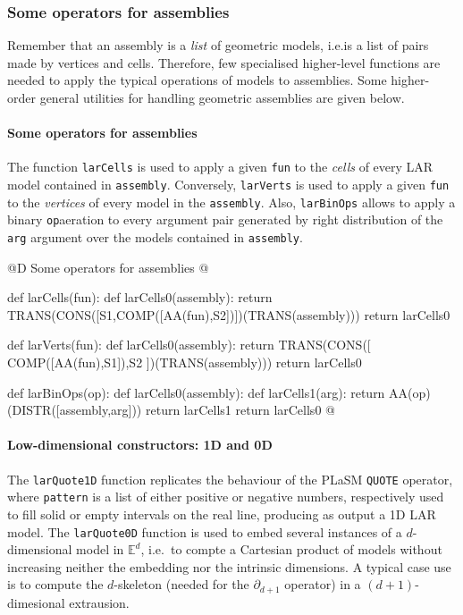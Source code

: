 \documentclass[11pt,oneside]{article}    %
\def\E{\mathbb{E}}
\begin{document}
\subsubsection{Some operators for assemblies}
Remember that an assembly is a \emph{list} of geometric models, i.e.is a list of pairs made by vertices and cells. Therefore, few specialised higher-level functions are needed to apply the typical operations of models to assemblies. Some higher-order general utilities for handling geometric assemblies are given below.  



\paragraph{Some operators for assemblies}
The function \texttt{larCells} is used to apply a given \texttt{fun} to the \emph{cells} of every LAR model contained in \texttt{assembly}. Conversely, \texttt{larVerts} is used to apply a given \texttt{fun} to the \emph{vertices} of every model in the \texttt{assembly}. Also, \texttt{larBinOps} allows to apply a binary \texttt{op}aeration to every argument pair generated by right distribution of the \texttt{arg} argument over the models contained in \texttt{assembly}.

@D Some operators for assemblies
@{
def larCells(fun):
    def larCells0(assembly):
        return TRANS(CONS([S1,COMP([AA(fun),S2])])(TRANS(assembly)))
    return larCells0

def larVerts(fun):
    def larCells0(assembly):
        return TRANS(CONS([ COMP([AA(fun),S1]),S2 ])(TRANS(assembly)))
    return larCells0

def larBinOps(op):
    def larCells0(assembly):
        def larCells1(arg):
            return AA(op)(DISTR([assembly,arg]))
        return larCells1
    return larCells0
@}

\paragraph{Low-dimensional constructors: 1D and 0D}
The \texttt{larQuote1D} function replicates the behaviour of the PLaSM \texttt{QUOTE} operator, where \texttt{pattern} is a list of either positive or negative numbers, respectively used to fill solid or empty intervals on the real line, producing as output a 1D LAR model. The \texttt{larQuote0D} function is used to embed several instances of a $d$-dimensional model in $\E^d$, i.e.~to compte a Cartesian product of models without increasing neither the embedding nor the intrinsic dimensions. A typical case use is to compute the $d$-skeleton (needed for the $\partial_{d+1}$ operator) in a $(d+1)$-dimesional extrausion.
\end{document}
